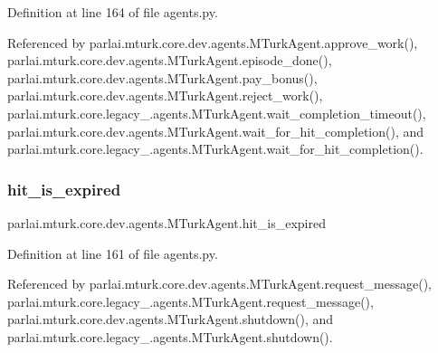Definition at line 164 of file agents.\+py.



Referenced by parlai.\+mturk.\+core.\+dev.\+agents.\+M\+Turk\+Agent.\+approve\+\_\+work(), parlai.\+mturk.\+core.\+dev.\+agents.\+M\+Turk\+Agent.\+episode\+\_\+done(), parlai.\+mturk.\+core.\+dev.\+agents.\+M\+Turk\+Agent.\+pay\+\_\+bonus(), parlai.\+mturk.\+core.\+dev.\+agents.\+M\+Turk\+Agent.\+reject\+\_\+work(), parlai.\+mturk.\+core.\+legacy\+\_.\+agents.\+M\+Turk\+Agent.\+wait\+\_\+completion\+\_\+timeout(), parlai.\+mturk.\+core.\+dev.\+agents.\+M\+Turk\+Agent.\+wait\+\_\+for\+\_\+hit\+\_\+completion(), and parlai.\+mturk.\+core.\+legacy\+\_.\+agents.\+M\+Turk\+Agent.\+wait\+\_\+for\+\_\+hit\+\_\+completion().

\mbox{\label{classparlai_1_1mturk_1_1core_1_1dev_1_1agents_1_1MTurkAgent_a0212e78d6715dda2fdbdfd3328ac54e5}} 
\subsubsection{\texorpdfstring{hit\+\_\+is\+\_\+expired}{hit\_is\_expired}}
{\footnotesize\ttfamily parlai.\+mturk.\+core.\+dev.\+agents.\+M\+Turk\+Agent.\+hit\+\_\+is\+\_\+expired}



Definition at line 161 of file agents.\+py.



Referenced by parlai.\+mturk.\+core.\+dev.\+agents.\+M\+Turk\+Agent.\+request\+\_\+message(), parlai.\+mturk.\+core.\+legacy\+\_.\+agents.\+M\+Turk\+Agent.\+request\+\_\+message(), parlai.\+mturk.\+core.\+dev.\+agents.\+M\+Turk\+Agent.\+shutdown(), and parlai.\+mturk.\+core.\+legacy\+\_.\+agents.\+M\+Turk\+Agent.\+shutdown().

\mbox{\label{classparlai_1_1mturk_1_1core_1_1dev_1_1agents_1_1MTurkAgent_a0419a2314bb516d8a16178af5bd0e7bd}} 
